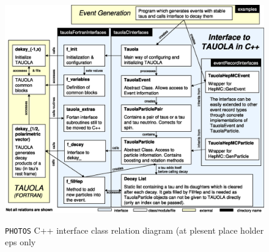 \documentclass[]{Photos_interface_design}
\begin{document}
\begin{figure}[h!]
\centering
\includegraphics[scale=0.6]{interface_design.eps}
\label{fig:design}
\caption{{\tt PHOTOS} C++ interface class relation diagram (at plesent place holder eps only}
\end{figure}
\end{document}
